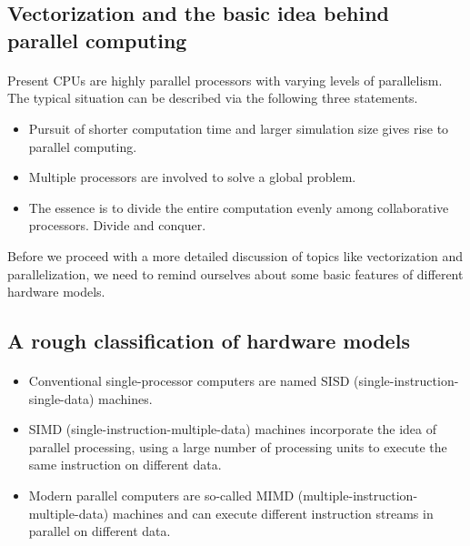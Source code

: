 \documentclass[%
oneside,                 %
final,                   %
10pt]{article}
\begin{document}
\subsection*{Vectorization and the basic idea behind parallel computing}

\paragraph{}
Present CPUs are highly parallel processors with varying levels of parallelism. The typical situation can be described via the following three statements.
\begin{itemize}
\item Pursuit of shorter computation time and larger simulation size gives rise to parallel computing.

\item Multiple processors are involved to solve a global problem.

\item The essence is to divide the entire computation evenly among collaborative processors.  Divide and conquer.
\end{itemize}

\noindent
Before we proceed with a more detailed discussion of topics like vectorization and parallelization, we need to remind ourselves about some basic features of different hardware models.



\subsection*{A rough classification of hardware models}

\paragraph{}

\begin{itemize}
\item Conventional single-processor computers are named SISD (single-instruction-single-data) machines.

\item SIMD (single-instruction-multiple-data) machines incorporate the idea of parallel processing, using a large number of processing units to execute the same instruction on different data.

\item Modern parallel computers are so-called MIMD (multiple-instruction-multiple-data) machines and can execute different instruction streams in parallel on different data.
\end{itemize}
\end{document}
